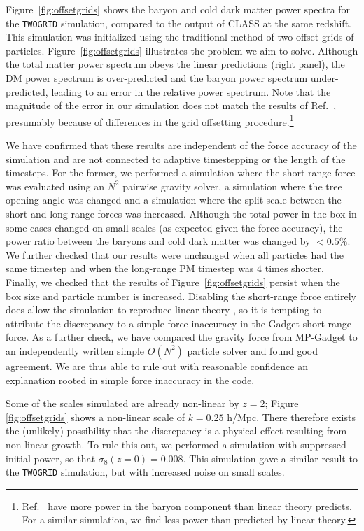 \documentclass[a4paper,11pt]{article}
\begin{document}
Figure~\ref{fig:offsetgrids} shows the baryon and cold dark matter power spectra for the \texttt{TWOGRID} simulation, compared to the output of CLASS at the same redshift. This simulation was initialized using the traditional method of two offset grids of particles. Figure~\ref{fig:offsetgrids} illustrates the problem we aim to solve. Although the total matter power spectrum obeys the linear predictions (right panel), the DM power spectrum is over-predicted and the baryon power spectrum under-predicted, leading to an error in the relative power spectrum. Note that the magnitude of the error in our simulation does not match the results of Ref.~\cite{Angulo:2013}, presumably because of differences in the grid offsetting procedure.\footnote{Ref.~\cite{Angulo:2013} have more power in the baryon component than linear theory predicts. For a similar simulation, we find less power than predicted by linear theory.}

We have confirmed that these results are independent of the force accuracy of the simulation and are not connected to adaptive timestepping or the length of the timesteps. For the former, we performed a simulation where the short range force was evaluated using an $N^2$ pairwise gravity solver, a simulation where the tree opening angle was changed and a simulation where the split scale between the short and long-range forces was increased. Although the total power in the box in some cases changed on small scales (as expected given the force accuracy), the power ratio between the baryons and cold dark matter was changed by $<0.5\%$. We further checked that our results were unchanged when all particles had the same timestep and when the long-range PM timestep was $4$ times shorter. Finally, we checked that the results of Figure~\ref{fig:offsetgrids} persist when the box size and particle number is increased. Disabling the short-range force entirely does allow the simulation to reproduce linear theory \cite{Angulo:2013}, so it is tempting to attribute the discrepancy to a simple force inaccuracy in the Gadget short-range force. As a further check, we have compared the gravity force from MP-Gadget to an independently written simple $O(N^2)$ particle solver and found good agreement. We are thus able to rule out with reasonable confidence an explanation rooted in simple force inaccuracy in the code.

Some of the scales simulated are already non-linear by $z=2$; Figure \ref{fig:offsetgrids} shows a non-linear scale of $k = 0.25$ h/Mpc. There therefore exists the (unlikely) possibility that the discrepancy is a physical effect resulting from non-linear growth. To rule this out, we performed a simulation with suppressed initial power, so that $\sigma_8(z=0) = 0.008$. This simulation gave a similar result to the \texttt{TWOGRID} simulation, but with increased noise on small scales.
\end{document}
